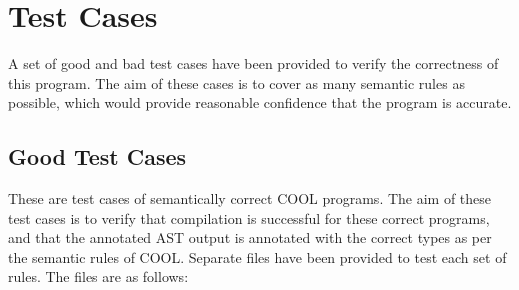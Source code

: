 \documentclass{article}
\begin{document}
\section{Test Cases}
A set of good and bad test cases have been provided to verify the correctness of this program. The aim of these cases is to cover as many semantic rules as possible, which would provide reasonable confidence that the program is accurate.

\subsection{Good Test Cases}
These are test cases of semantically correct COOL programs. The aim of these test cases is to verify that compilation is successful for these correct programs, and that the annotated AST output is annotated with the correct types as per the semantic rules of COOL. Separate files have been provided to test each set of rules. The files are as follows:
\end{document}
